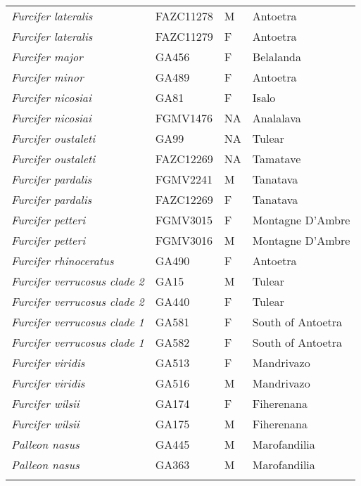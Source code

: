 \begin{longtable}{llll}
\textit{Furcifer lateralis} & FAZC11278 & M & Antoetra\\
\textit{Furcifer lateralis} & FAZC11279 & F & Antoetra\\
\textit{Furcifer major} & GA456 & F & Belalanda\\
\textit{Furcifer minor} & GA489 & F & Antoetra\\
\textit{Furcifer nicosiai} & GA81 & F & Isalo\\
\textit{Furcifer nicosiai} & FGMV1476 & NA & Analalava\\
\textit{Furcifer oustaleti} & GA99 & NA & Tulear\\
\textit{Furcifer oustaleti} & FAZC12269 & NA & Tamatave\\
\textit{Furcifer pardalis} & FGMV2241 & M & Tanatava\\
\textit{Furcifer pardalis} & FAZC12269 & F & Tanatava\\
\textit{Furcifer petteri} & FGMV3015 & F & Montagne D'Ambre\\
\textit{Furcifer petteri} & FGMV3016 & M & Montagne D'Ambre\\
\textit{Furcifer rhinoceratus} & GA490 & F & Antoetra\\
\textit{Furcifer verrucosus clade 2} & GA15 & M & Tulear\\
\textit{Furcifer verrucosus clade 2} & GA440 & F & Tulear\\
\textit{Furcifer verrucosus clade 1} & GA581 & F & South of Antoetra\\
\textit{Furcifer verrucosus clade 1} & GA582 & F & South of Antoetra\\
\textit{Furcifer viridis} & GA513 & F & Mandrivazo\\
\textit{Furcifer viridis} & GA516 & M & Mandrivazo\\
\textit{Furcifer wilsii} & GA174 & F & Fiherenana\\
\textit{Furcifer wilsii} & GA175 & M & Fiherenana\\
\hline
\textit{Palleon nasus} & GA445 & M & Marofandilia\\
\textit{Palleon nasus} & GA363 & M & Marofandilia\\
\hline

\label{table-samples}
\end{longtable}
